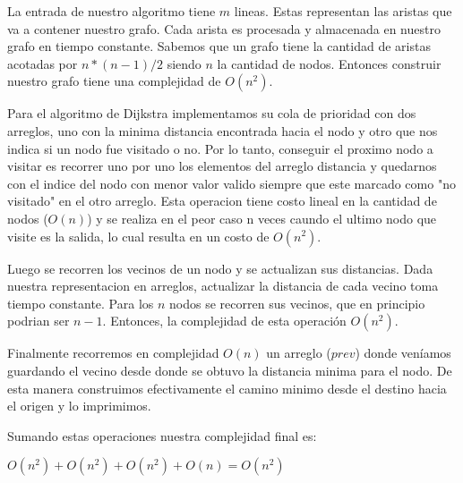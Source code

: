 La entrada de nuestro algoritmo tiene $m$ lineas. Estas representan las aristas que va a contener nuestro grafo. Cada arista es procesada y almacenada en nuestro grafo en tiempo constante. Sabemos que un grafo tiene la cantidad de aristas acotadas por $n*(n-1)/2$ siendo $n$ la cantidad de nodos. Entonces construir nuestro grafo tiene una complejidad de $O(n^2)$.

Para el algoritmo de Dijkstra implementamos su cola de prioridad con dos arreglos, uno con la minima distancia encontrada hacia el nodo y otro que nos indica si un nodo fue visitado o no. Por lo tanto, conseguir el proximo nodo a visitar es recorrer uno por uno los elementos del arreglo distancia y quedarnos con el indice del nodo con menor valor valido siempre que este marcado como "no visitado" en el otro arreglo. Esta operacion tiene costo lineal en  la cantidad de nodos ($O(n)$) y se realiza en el peor caso n veces caundo el ultimo nodo que visite es la salida, lo cual resulta en un costo de $O(n^2)$. 

Luego se recorren los vecinos de un nodo y se actualizan sus distancias. Dada nuestra representacion en arreglos, actualizar la distancia de cada vecino toma tiempo constante. Para los $n$ nodos se recorren sus vecinos, que en principio podrian ser $n-1$. Entonces, la complejidad de esta operación $O(n^2)$.

Finalmente recorremos en complejidad $O(n)$ un arreglo ($prev$) donde veníamos guardando el vecino desde donde se obtuvo la distancia minima para el nodo. De esta manera construimos efectivamente el camino minimo desde el destino hacia el origen y lo imprimimos. 

Sumando estas operaciones nuestra complejidad final es:

$O(n^2) + O(n^2) + O(n^2) + O(n) = O(n^2)$